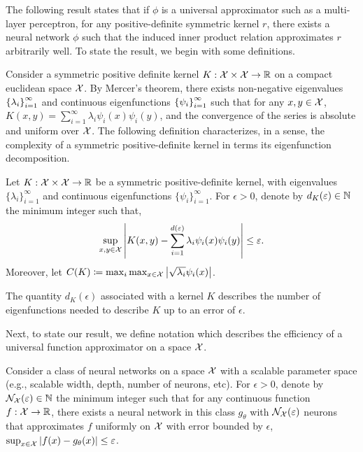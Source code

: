 
The following result states that if $\phi$ is a universal approximator such as a multi-layer perceptron, for any positive-definite symmetric kernel $r$, there exists a neural network $\phi$ such that the induced inner product relation approximates $r$ arbitrarily well. To state the result, we begin with some definitions.

Consider a symmetric positive definite kernel $K: {\mathcal{X}} \times {\mathcal{X}} \to \mathbb{R}$ on a compact euclidean space ${\mathcal{X}}$. By Mercer's theorem\parencite{mercerFunctionsPositive1909, sunMercerTheorem2005, micchelliUniversalKernels2006}, there exists non-negative eigenvalues $\left\{\lambda_i\right\}_{i=1}^{\infty}$ and continuous eigenfunctions $\left\{\psi_i\right\}_{i=1}^{\infty}$ such that for any $x,y \in {\mathcal{X}}$, $K(x, y) = \sum_{i=1}^\infty \lambda_i \psi_i(x) \psi_i(y)$, and the convergence of the series is absolute and uniform over ${\mathcal{X}}$. The following definition characterizes, in a sense, the complexity of a symmetric positive-definite kernel in terms its eigenfunction decomposition.

\begin{definition}\label{def:sym_pd_ker_specturm_decay}
	Let $K: {\mathcal{X}} \times {\mathcal{X}} \to \mathbb{R}$ be a symmetric positive-definite kernel, with eigenvalues $\{\lambda_i\}_{i=1}^{\infty}$ and continuous eigenfunctions $\{\psi_i\}_{i=1}^{\infty}$. For $\epsilon > 0$, denote by $d_K(\varepsilon) \in \mathbb{N}$ the minimum integer such that,
	\begin{equation*}
		\sup_{x, y \in \calX} \abs{K(x, y) - \sum_{i=1}^{d(\epsilon)} \lambda_i \psi_i(x) \psi_i(y)} \leq \epsilon.
	\end{equation*}
	Moreover, let $C(K) \coloneq \max_{i} \max_{x \in {\mathcal{X}}} \left\lvert\sqrt{\lambda_i} \psi_i(x)\right\rvert$.
\end{definition}

The quantity $d_K(\epsilon)$ associated with a kernel $K$ describes the number of eigenfunctions needed to describe $K$ up to an error of $\epsilon$. %

Next, to state our result, we define notation which describes the efficiency of a universal function approximator on a space ${\mathcal{X}}$.
\begin{definition}\label{def:univ_approx_efficiency}
	Consider a class of neural networks on a space ${\mathcal{X}}$ with a scalable parameter space (e.g., scalable width, depth, number of neurons, etc). For $\epsilon > 0$, denote by ${\mathcal{N}}_{\mathcal{X}}(\varepsilon) \in \mathbb{N}$ the minimum integer such that for any continuous function $f: {\mathcal{X}} \to \mathbb{R}$, there exists a neural network in this class $g_\theta$ with ${\mathcal{N}}_{\mathcal{X}}(\varepsilon)$ neurons that approximates $f$ uniformly on ${\mathcal{X}}$ with error bounded by $\epsilon$, $\sup_{x \in {\mathcal{X}}} \left\lvert f(x) - g_\theta(x)\right\rvert \leq \varepsilon$.
\end{definition}

